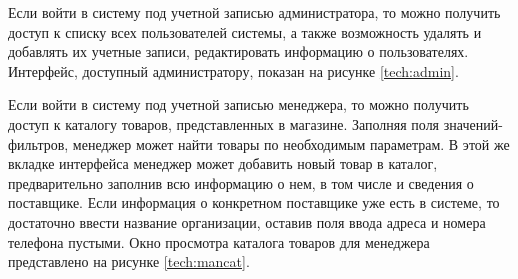 Если войти в систему под учетной записью администратора, то можно получить доступ к списку всех пользователей системы, а также возможность удалять и добавлять их учетные записи, редактировать информацию о пользователях. Интерфейс, доступный администратору, показан на рисунке \ref{tech:admin}.

\begin{figure}[H]
\end{figure}

Если войти в систему под учетной записью менеджера, то можно получить доступ к каталогу товаров, представленных в магазине. Заполняя поля значений-фильтров, менеджер может найти товары по необходимым параметрам. В этой же вкладке интерфейса менеджер может добавить новый товар в каталог, предварительно заполнив всю информацию о нем, в том числе и сведения о поставщике. Если информация о конкретном поставщике уже есть в системе, то достаточно ввести название организации, оставив поля ввода адреса и номера телефона пустыми. Окно просмотра каталога товаров для менеджера представлено на рисунке \ref{tech:mancat}.

\begin{figure}[H]
\end{figure}

